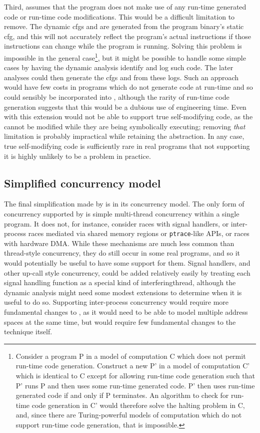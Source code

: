 Third, {\implementation} assumes that the program does not make use of
any run-time generated code or run-time code modifications.  This
would be a difficult limitation to remove.  The \glspl{dynamic cfg}
and {\StateMachines} are generated from the program binary's
\gls{static cfg}, and this will not accurately reflect the program's
actual instructions if those instructions can change while the program
is running.  Solving this problem is impossible in the general
case\footnote{Consider a program P in a model of computation C which
  does not permit run-time code generation.  Construct a new P' in a
  model of computation C' which is identical to C except for allowing
  run-time code generation such that P' runs P and then uses some
  run-time generated code.  P' then uses run-time generated code if
  and only if P terminates.  An algorithm to check for run-time code
  generation in C' would therefore solve the halting problem in C,
  and, since there are Turing-powerful models of computation which do
  not support run-time code generation, that is impossible.}, but it
might be possible to handle some simple cases by having the dynamic
analysis identify and log such code.  The later analyses could then
generate the \glspl{cfg} and {\StateMachines} from these logs.  Such
an approach would have few costs in programs which do not generate
code at run-time and so could sensibly be incorporated into
{\implementation}, although the rarity of run-time code generation
suggests that this would be a dubious use of engineering time.  Even
with this extension {\implementation} would not be able to support
true self-modifying code, as the {\StateMachines} cannot be modified
while they are being symbolically executing; removing \emph{that}
limitation is probably impractical while retaining the {\StateMachine}
abstraction.  In any case, true self-modifying code is sufficiently
rare in real programs that not supporting it is highly unlikely to be
a problem in practice.

\subsection{Simplified concurrency model}
The final simplification made by {\implementation} is in its
concurrency model.  The only form of concurrency supported by
{\implementation} is simple multi-thread concurrency within a single
program.  It does not, for instance, consider races with signal
handlers, or inter-process races mediated via shared memory regions or
\texttt{ptrace}-like APIs, or races with hardware DMA.  While these
mechanisms are much less common than thread-style concurrency, they do
still occur in some real programs, and so it would potentially be
useful to have some support for them.  Signal handlers, and other
up-call style concurrency, could be added relatively easily by
treating each signal handling function as a special kind of
\gls{interferingthread}, although the dynamic analysis might need some
modest extensions to determine when it is useful to do so.  Supporting
inter-process concurrency would require more fundamental changes to
{\implementation}, as it would need to be able to model multiple
address spaces at the same time, but would require few fundamental
changes to the {\technique} technique itself.

